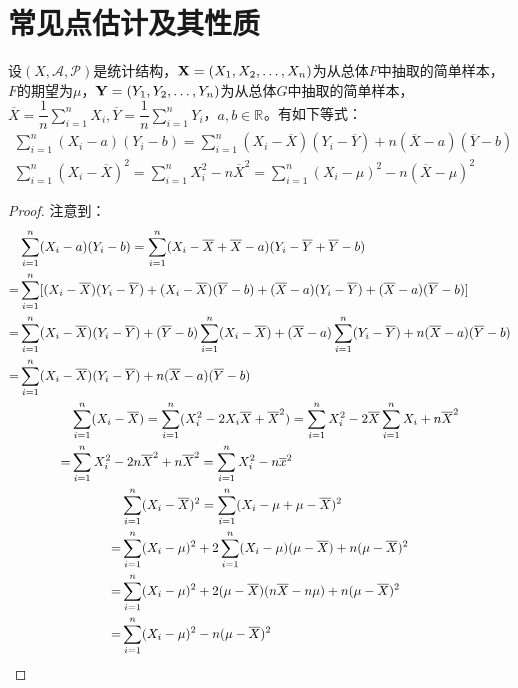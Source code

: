 \section{常见点估计及其性质}
\begin{theorem}\label{theo:xbar}
	设$(X,\mathscr{A},\mathscr{P})$是统计结构，$\mathbf{X}=(X_1, X_2, \dots, X_{n})$为从总体$F$中抽取的简单样本，$F$的期望为$\mu$，$\mathbf{Y}=(Y_1, Y_2, \dots, Y_{n})$为从总体$G$中抽取的简单样本，$\overline{X}=\dfrac{1}{n}\sum\limits_{i=1}^{n}X_i,\overline{Y}=\dfrac{1}{n}\sum\limits_{i=1}^{n}Y_i$，$a,b\in\mathbb{R}^{}$。有如下等式：
	\begin{gather*}
		\sum_{i=1}^{n}(X_i-a)(Y_i-b)=\sum_{i=1}^{n}(X_i-\overline{X})(Y_i-\overline{Y})+n(\overline{X}-a)(\overline{Y}-b) \\
		\sum_{i=1}^{n}(X_i-\overline{X})^2=\sum_{i=1}^{n}X_i^2-n\overline{X}^2=\sum_{i=1}^{n}(X_i-\mu)^2-n(\overline{X}-\mu)^2
	\end{gather*}
\end{theorem}
\begin{proof}
	注意到：
	\begin{gather*}
		\begin{aligned}
			&\sum_{i=1}^{n}(X_i-a)(Y_i-b)=\sum_{i=1}^{n}(X_i-\overline{X}+\overline{X}-a)(Y_i-\overline{Y}+\overline{Y}-b)  \\
			=&\sum_{i=1}^{n}[(X_i-\overline{X})(Y_i-\overline{Y})+(X_i-\overline{X})(\overline{Y}-b)+(\overline{X}-a)(Y_i-\overline{Y})+(\overline{X}-a)(\overline{Y}-b)] \\
			=&\sum_{i=1}^{n}(X_i-\overline{X})(Y_i-\overline{Y})+(\overline{Y}-b)\sum_{i=1}^{n}(X_i-\overline{X})+(\overline{X}-a)\sum_{i=1}^{n}(Y_i-\overline{Y})+n(\overline{X}-a)(\overline{Y}-b) \\
			=&\sum_{i=1}^{n}(X_i-\overline{X})(Y_i-\overline{Y})+n(\overline{X}-a)(\overline{Y}-b)
		\end{aligned} \\
		\begin{aligned}
			&\sum_{i=1}^{n}(X_i-\overline{X})=\sum_{i=1}^{n}(X_i^2-2X_i\overline{X}+\overline{X}^2)=\sum_{i=1}^{n}X_i^2-2\overline{X}\sum_{i=1}^{n}X_i+n\overline{X}^2 \\
			=&\sum_{i=1}^{n}X_i^2-2n\overline{X}^2+n\overline{X}^2=\sum_{i=1}^{n}X_i^2-n\overline{x}^2
		\end{aligned} \\
		\begin{aligned}
			&\sum_{i=1}^{n}(X_i-\overline{X})^2=\sum_{i=1}^{n}(X_i-\mu+\mu-\overline{X})^2 \\
			=&\sum_{i=1}^{n}(X_i-\mu)^2+2\sum_{i=1}^{n}(X_i-\mu)(\mu-\overline{X})+n(\mu-\overline{X})^2 \\
			=&\sum_{i=1}^{n}(X_i-\mu)^2+2(\mu-\overline{X})(n\overline{X}-n\mu)+n(\mu-\overline{X})^2 \\
			=&\sum_{i=1}^{n}(X_i-\mu)^2-n(\mu-\overline{X})^2
		\end{aligned}\qedhere
	\end{gather*}
\end{proof}
